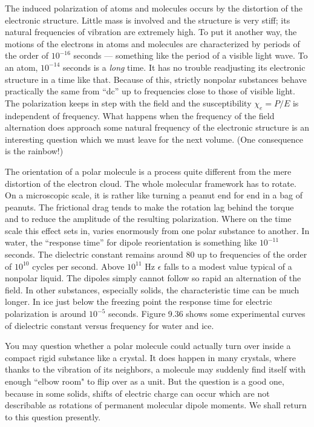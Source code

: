 The induced polarization of atoms and molecules occurs by the
distortion of the electronic structure. Little mass is involved and
the structure is very stiff; its natural frequencies of vibration are extremely
high. To put it another way, the motions of the electrons
in atoms and molecules are characterized by periods of the order
of $10^{-16}$ seconds --- something like the period of a visible light wave.
To an atom, $10^{-14}$ seconds is a \emph{long} time. It has no trouble readjusting
its electronic structure in a time like that. Because of this,
strictly nonpolar substances behave practically the same from ``dc''
up to frequencies close to those of visible light. The polarization
keeps in step with the field and the susceptibility $\chi_e = P/E$ is independent
of frequency. What happens when the frequency of the
field alternation does approach some natural frequency of the electronic
structure is an interesting question which we must leave for
the next volume. (One consequence is the rainbow!)

The orientation of a polar molecule is a process quite different
from the mere distortion of the electron cloud. The whole molecular
framework has to rotate. On a microscopic scale, it is rather like
turning a peanut end for end in a bag of peanuts. The frictional
drag tends to make the rotation lag behind the torque and to reduce
the amplitude of the resulting polarization. Where on the time scale
this effect sets in, varies enormously from one polar substance to
another. In water, the ``response time'' for dipole reorientation is
something like $10^{-11}$ seconds. The dielectric constant remains
around 80 up to frequencies of the order of $10^{10}$ cycles per second.
Above $10^{11}$ Hz $\epsilon$ falls to a modest value typical of a nonpolar
liquid. The dipoles simply cannot follow so rapid an alternation of
the field. In other substances, especially solids, the characteristic
time can be much longer. In ice just below the freezing point the
response time for electric polarization is around $10^{-5}$ seconds.
Figure 9.36 shows some experimental curves of dielectric constant
versus frequency for water and ice.

You may question whether a polar molecule could actually turn
over inside a compact rigid substance like a crystal. It does happen
in many crystals, where thanks to the vibration of its neighbors, a
molecule may suddenly find itself with enough ``elbow room" to
flip over as a unit. But the question is a good one, because in some
solids, shifts of electric charge can occur which are not describable
as rotations of permanent molecular dipole moments. We shall return
to this question presently.

